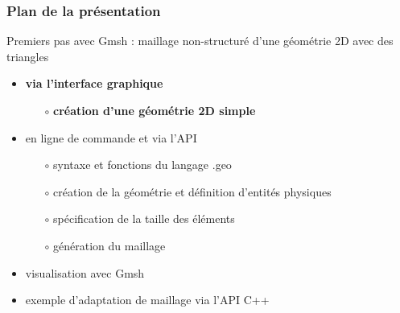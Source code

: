 \documentclass[aspectratio=169]{beamer}
\begin{document}
\begin{frame}[fragile]
\frametitle{Plan de la présentation}
Premiers pas avec Gmsh : maillage non-structuré d'une géométrie 2D avec des triangles
\begin{itemize}
  \item \textbf{via l'interface graphique}
  \begin{itemize}
    \item[$\circ$] \textbf{création d'une géométrie 2D simple}
  \end{itemize}
  \item en ligne de commande et via l'API
  \begin{itemize}
    \item[$\circ$] syntaxe et fonctions du langage .geo
    \item[$\circ$] création de la géométrie et définition d'entités physiques
    \item[$\circ$] spécification de la taille des éléments
    \item[$\circ$] génération du maillage
  \end{itemize}
  \item visualisation avec Gmsh
  \item exemple d'adaptation de maillage via l'API C++
\end{itemize}
\end{frame}
\end{document}
